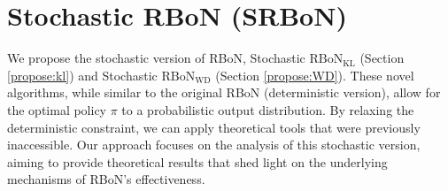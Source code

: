 \section{Stochastic RBoN (SRBoN)}

We propose the stochastic version of RBoN, Stochastic $\mathrm{RBoN}_{\mathrm{KL}}$ (Section \ref{propose:kl}) and Stochastic $\mathrm{RBoN}_{\mathrm{WD}}$ (Section \ref{propose:WD}). 
These novel algorithms, while similar to the original RBoN (deterministic version), allow for the optimal policy $\pi$ to a probabilistic output distribution. By relaxing the deterministic constraint, we can apply theoretical tools that were previously inaccessible. Our approach focuses on the analysis of this stochastic version, aiming to provide theoretical results that shed light on the underlying mechanisms of RBoN's effectiveness.


